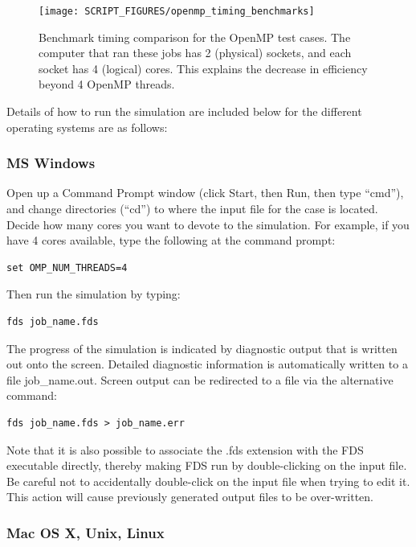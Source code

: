 \documentclass[11pt]{book}
\begin{document}
\begin{figure}[ht!]
\centering
\texttt{[image: SCRIPT\_FIGURES/openmp\_timing\_benchmarks]}
\caption[OpenMP timing study]{Benchmark timing comparison for the OpenMP test cases. The computer that ran these jobs has 2 (physical) sockets, and each socket has 4 (logical) cores. This explains the decrease in efficiency beyond 4 OpenMP threads.}
\label{fig:openmp_timing_benchmarks}
\end{figure}
Details of how to run the simulation are included below for the different operating systems are as follows:

\subsubsection{MS Windows}

Open up a Command Prompt window (click Start, then Run, then type ``cmd''), and change directories (``cd'') to where the input file for the case is located. Decide how many cores you want to devote to the simulation. For example, if you have 4 cores available, type the following at the command prompt:
\begin{lstlisting}
set OMP_NUM_THREADS=4
\end{lstlisting}
Then run the simulation by typing:
\begin{lstlisting}
fds job_name.fds
\end{lstlisting}
The progress of the simulation is indicated by diagnostic output that is written out onto the screen. Detailed diagnostic information is automatically written to a file {\ct job\_name.out}. Screen output can be redirected to a file via the alternative command:
\begin{lstlisting}
fds job_name.fds > job_name.err
\end{lstlisting}
Note that it is also possible to associate the {\ct .fds} extension with the FDS executable directly, thereby making FDS run by double-clicking on the input file. Be careful not to accidentally double-click on the input file when trying to edit it. This action will cause previously generated output files to be over-written.

\subsubsection{Mac OS X, Unix, Linux}
\end{document}
